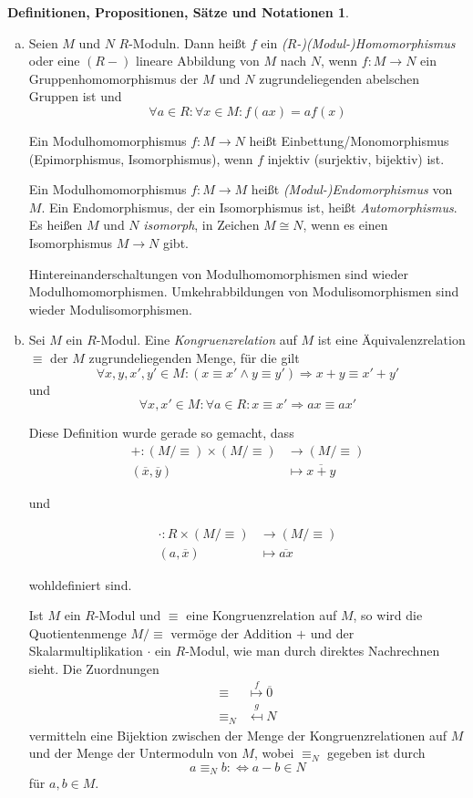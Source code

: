 \documentclass[
twoside=semi,
fontsize=12,
DIV=12, 
cleardoublepage=current,
leqno,
headings=optiontoheadandtoc, 
toc=idx
]{scrbook}
\theoremstyle{definition}
\newtheorem{def-prop-satz-not}[definition]{Definitionen, Propositionen, S\"atze und Notationen}
\begin{document}
\begin{def-prop-satz-not}
\begin{enumerate}[(a)]
			\item Seien $M$ und $N$ $R$-Moduln. Dann hei\ss t $f$ ein \emph{($R$-)(Modul-)Homomorphismus} oder eine $(R-)$ lineare Abbildung von $M$ nach $N$, wenn $f:M\to N$ ein Gruppenhomomorphismus der $M$ und $N$ zugrundeliegenden abelschen Gruppen ist und 
			\[\forall a \in R: \forall x \in M: f(ax) = af(x) \]
			
			Ein Modulhomomorphismus $f:M\to N$ hei\ss t Einbettung/Monomorphismus (Epimorphismus, Isomorphismus), wenn $f$ injektiv (surjektiv, bijektiv) ist. 
			
			Ein Modulhomomorphismus $f:M \to M$ hei\ss t \emph{(Modul-)Endomorphismus} von $M$. Ein Endomorphismus, der ein Isomorphismus ist, hei\ss t \emph{Automorphismus}. Es hei\ss en $M$ und $N$ \emph{isomorph}, in Zeichen $M \cong N$, wenn es einen Isomorphismus $M \to N$ gibt.
			
			Hintereinanderschaltungen von Modulhomomorphismen sind wieder Modulhomomorphismen. Umkehrabbildungen von Modulisomorphismen sind wieder Modulisomorphismen.
			
			\item Sei $M$ ein $R$-Modul. Eine \emph{Kongruenzrelation} auf $M$ ist eine \"Aquivalenzrelation $\equiv$ der $M$ zugrundeliegenden Menge, f\"ur die gilt
			\[\forall x, y, x', y' \in M: (x \equiv x' \land y \equiv y') \Rightarrow x + y \equiv x' + y'\]
			und
			\[\forall x, x' \in M: \forall a \in R: x \equiv x' \Rightarrow ax \equiv ax'\]
			
			Diese Definition wurde gerade so gemacht, dass 
			\begin{align*}
				+:( M/\equiv) \times (M/\equiv) &\to (M/\equiv)\\
				 (\overline{x}, \overline{y}) &\mapsto \overline{x + y}
			\end{align*}

			und	

			\begin{align*}
				\cdot: R \times (M/\equiv) &\to (M/\equiv)\\
				(a, \overline{x}) &\mapsto \overline{ax}
			\end{align*}
		
			wohldefiniert sind.
			
			Ist $M$ ein $R$-Modul und $\equiv$ eine Kongruenzrelation auf $M$, so wird die Quotientenmenge $M/\equiv$ verm\"oge der Addition $+$ und der Skalarmultiplikation $\cdot$ ein $R$-Modul, wie man
			durch direktes Nachrechnen sieht. Die Zuordnungen
			\begin{align*}
				\equiv  &\overset{f}{\mapsto} \overline{0}\\
				\equiv_N &\overset{g}{\mapsfrom} N
			\end{align*}
			vermitteln eine Bijektion zwischen der Menge der Kongruenzrelationen auf $M$ und der Menge der Untermoduln von $M$, wobei $\equiv_N$ gegeben ist durch
			\[a \equiv_N b :\Leftrightarrow a - b \in N\]
			f\"ur $a, b \in M$.
			

\end{enumerate}
\end{def-prop-satz-not}
\end{document}
